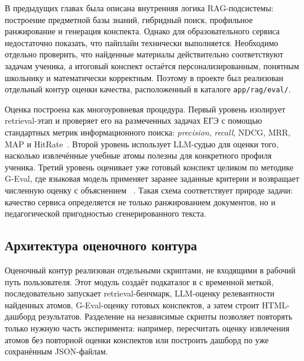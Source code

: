 \documentclass[a4paper,12pt]{extarticle}
\newcommand{\code}[1]{\texttt{\seqsplit{#1}}}
\begin{document}
В предыдущих главах была описана внутренняя логика RAG-подсистемы: построение
предметной базы знаний, гибридный поиск, профильное ранжирование и генерация
конспекта. Однако для образовательного сервиса недостаточно показать, что
пайплайн технически выполняется. Необходимо отдельно проверить, что найденные
материалы действительно соответствуют задачам ученика, а итоговый конспект
остаётся персонализированным, понятным школьнику и математически корректным.
Поэтому в проекте был реализован отдельный контур оценки качества,
расположенный в каталоге \texttt{app/rag/eval/}.

Оценка построена как многоуровневая процедура. Первый уровень изолирует
retrieval-этап и проверяет его на размеченных задачах ЕГЭ с помощью стандартных
метрик информационного поиска: \textit{precision}, \textit{recall}, NDCG, MRR,
MAP и HitRate~\cite{manning2008ir,jarvelin2002cumulated,voorhees1999trec}.
Второй уровень использует LLM-судью для оценки того, насколько извлечённые
учебные атомы полезны для конкретного профиля ученика. Третий уровень оценивает
уже готовый конспект целиком по методике G-Eval, где языковая модель применяет
заранее заданные критерии и возвращает численную оценку с объяснением
~\cite{liu2023geval,deepeval2026}. Такая схема соответствует природе задачи:
качество сервиса определяется не только ранжированием документов, но и
педагогической пригодностью сгенерированного текста.

\subsection{Архитектура оценочного контура}

Оценочный контур реализован отдельными скриптами, не входящими в рабочий путь
пользователя. Этот модуль создаёт
подкаталог в \code{app/rag/eval/metrics/} с временной меткой, последовательно
запускает retrieval-бенчмарк, LLM-оценку релевантности найденных атомов,
G-Eval-оценку готовых конспектов, а затем строит HTML-дашборд результатов.
Разделение на независимые скрипты позволяет повторять только нужную часть
эксперимента: например, пересчитать оценку извлечения атомов без повторной оценки конспектов
или построить дашборд по уже сохранённым JSON-файлам.
\end{document}

